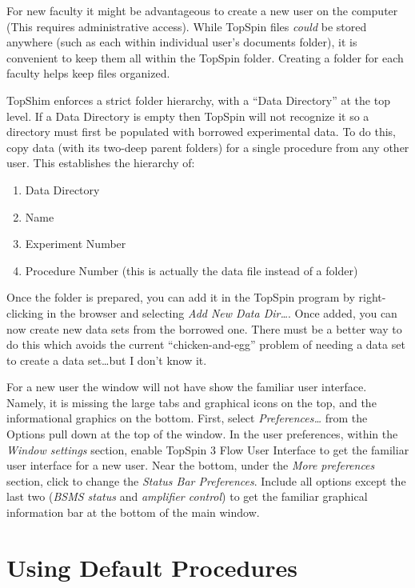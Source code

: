 \documentclass[12pt, openany, letterpaper]{memoir}
\begin{document}
For new faculty it might be advantageous to create a new user on the computer (This requires administrative access). While TopSpin files \emph{could} be stored anywhere (such as each within individual user's documents folder), it is convenient to keep them all within the TopSpin folder. Creating a folder for each faculty helps keep files organized.

TopShim enforces a strict folder hierarchy, with a ``Data Directory'' at the top level. If a Data Directory is empty then TopSpin will not recognize it so a directory must first be populated with borrowed experimental data. To do this, copy data (with its two-deep parent folders) for a single procedure from any other user. This establishes the hierarchy  of:

\begin{enumerate}
\item Data Directory
\item Name
\item Experiment Number
\item Procedure Number (this is actually the data file instead of a folder)
\end{enumerate}

Once the folder is prepared, you can add it in the TopSpin program by right-clicking in the browser and selecting \emph{Add New Data Dir\ldots}. Once added, you can now create new data sets from the borrowed one. There must be a better way to do this which avoids the current ``chicken-and-egg'' problem of needing a data set to create a data set\ldots but I don't know it.

For a new user the window will not have show the familiar user interface. Namely, it is missing the large tabs and graphical icons on the top, and the informational graphics on the bottom. First, select \emph{Preferences\ldots} from the Options pull down at the top of the window. In the user preferences, within the \emph{Window settings} section, enable TopSpin 3 Flow User Interface to get the familiar user interface for a new user. Near the bottom, under the \emph{More preferences} section, click to change the \emph{Status Bar Preferences}. Include all options except the last two (\emph{BSMS status} and \emph{amplifier control}) to get the familiar graphical information bar at the bottom of the main window. 

\chapter{Using Default Procedures}
\label{CH:Default}
\end{document}

